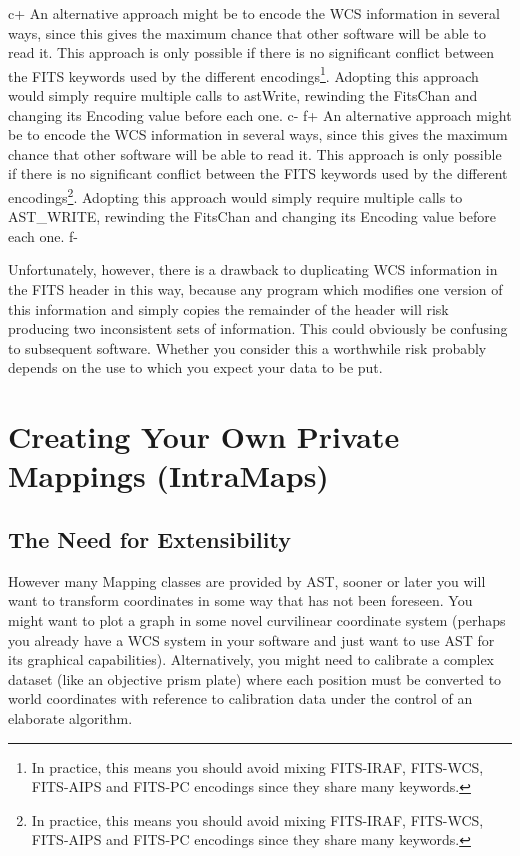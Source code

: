 \documentclass[twoside,11pt]{article}
\begin{document}
c+
An alternative approach might be to encode the WCS information in several
ways, since this gives the maximum chance that other software will be
able to read it. This approach is only possible if there is no
significant conflict between the FITS keywords used by the different
encodings\footnote{In practice, this means you should avoid mixing
FITS-IRAF, FITS-WCS, FITS-AIPS and FITS-PC encodings since they share
many keywords.}.  Adopting this approach would simply require multiple
calls to astWrite, rewinding the FitsChan and changing its Encoding value
before each one.
c-
f+
An alternative approach might be to encode the WCS information in several
ways, since this gives the maximum chance that other software will be
able to read it. This approach is only possible if there is no
significant conflict between the FITS keywords used by the different
encodings\footnote{In practice, this means you should avoid mixing
FITS-IRAF, FITS-WCS, FITS-AIPS and FITS-PC encodings since they share
many keywords.}.  Adopting this approach would simply require multiple
calls to AST\_WRITE, rewinding the FitsChan and changing its Encoding value
before each one.
f-

Unfortunately, however, there is a drawback to duplicating WCS
information in the FITS header in this way, because any program which
modifies one version of this information and simply copies the
remainder of the header will risk producing two inconsistent sets of
information. This could obviously be confusing to subsequent
software. Whether you consider this a worthwhile risk probably depends
on the use to which you expect your data to be put.

\cleardoublepage
\section{\label{ss:intramaps}Creating Your Own Private Mappings (IntraMaps)}

\subsection{The Need for Extensibility}

However many Mapping classes are provided by AST, sooner or later you
will want to transform coordinates in some way that has not been
foreseen. You might want to plot a graph in some novel curvilinear
coordinate system (perhaps you already have a WCS system in your
software and just want to use AST for its graphical capabilities).
Alternatively, you might need to calibrate a complex dataset (like an
objective prism plate) where each position must be converted to world
coordinates with reference to calibration data under the control of an
elaborate algorithm.
\end{document}
